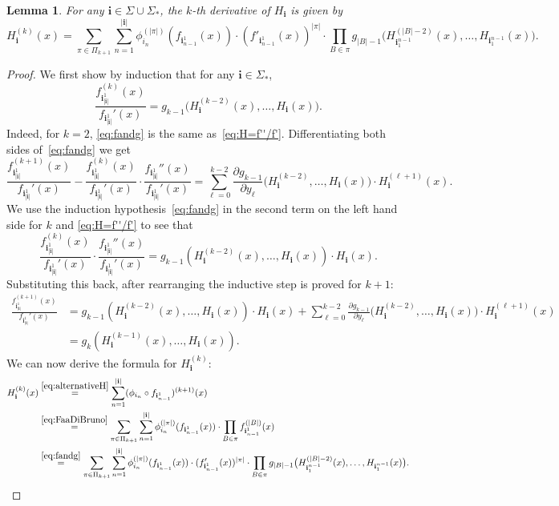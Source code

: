 \documentclass[11pt,a4paper]{article}
\def\cref#1{\ref{#1}}%
\newtheorem{lemma}[theorem]{Lemma}
\theoremstyle{definition}
\theoremstyle{remark}
\newcommand{\0}{\mathbf{0}}
\newcommand{\bi}{\mathbf{i}}
\numberwithin{equation}{section}
\begin{document}
\begin{lemma}
\label{thm:ugly}
For any $\bi\in\Sigma\cup\Sigma_*$, the $k$-th derivative of $H_{\bi}$ is given by
\[
H_{\bi}^{(k)}(x)
=\sum_{\pi\in\Pi_{k+1}} \sum_{n=1}^{|\bi|} \phi_{i_n}^{(|\pi|)}(f_{\bi_{n-1}^1}(x))\cdot
(f'_{\bi_{n-1}^1}(x))^{|\pi|}\cdot \prod_{B\in\pi}
g_{|B|-1}\big(H_{\bi_1^{n-1}}^{(|B|-2)}(x),\dots,H_{\bi_1^{n-1}}(x)\big).
\]
\end{lemma}
\begin{proof}
We first show by induction that for any $\bi\in\Sigma_*$,
\begin{equation}
	\label{eq:fandg}
	\frac{f_{\bi_{|\bi|}^1}^{(k)}(x)}{f_{\bi_{|\bi|}^1}'(x)}
	=
	g_{k-1}\big(H_{\bi}^{(k-2)}(x), \dots, H_{\bi}(x)\big).
\end{equation}
Indeed, for $k=2$, \cref{eq:fandg} is the same as~\cref{eq:H=f''/f'}. Differentiating both sides
of~\cref{eq:fandg} we get
\[
\frac{f_{\bi_{|\bi|}^1}^{(k+1)}(x)}{f_{\bi_{|\bi|}^1}'(x)} -
\frac{f_{\bi_{|\bi|}^1}^{(k)}(x)}{f_{\bi_{|\bi|}^1}'(x)}\cdot
\frac{f_{\bi_{|\bi|}^1}''(x)}{f_{\bi_{|\bi|}^1}'(x)}
=\sum_{\ell=0}^{k-2}\frac{\partial g_{k-1}}{\partial
y_{\ell}}\big(H_{\bi}^{(k-2)},\dots,H_{\bi}(x)\big) \cdot H_{\bi}^{(\ell+1)}(x).
\]
We use the induction hypothesis~\cref{eq:fandg} in the second term on the left hand side for $k$
and \cref{eq:H=f''/f'} to see that
\[
\frac{f_{\bi_{|\bi|}^1}^{(k)}(x)}{f_{\bi_{|\bi|}^1}'(x)}\cdot
\frac{f_{\bi_{|\bi|}^1}''(x)}{f_{\bi_{|\bi|}^1}'(x)}
=g_{k-1}(H_{\bi}^{(k-2)}(x),\dots, H_{\bi}(x)) \cdot H_{\bi}(x).
\]
Substituting this back, after rearranging the inductive step is proved for $k+1$: 
\begin{align*}
\frac{f_{\bi_{|\bi|}^1}^{(k+1)}(x)}{f_{\bi_{|\bi|}^1}'(x)}
&=
g_{k-1}(H_{\bi}^{(k-2)}(x),\dots, H_{\bi}(x)) \cdot H_{\bi}(x)
+
\sum_{\ell=0}^{k-2}\frac{\partial g_{k-1}}{\partial
y_{\ell}}\big(H_{\bi}^{(k-2)},\dots,H_{\bi}(x)\big) \cdot H_{\bi}^{(\ell+1)}(x)
\\
&=
g_{k}(H_{\bi}^{(k-1)}(x), \dots, H_{\bi}(x)).
\end{align*}
We can now derive the formula for $H_{\bi}^{(k)}$:
\begin{align*}
H_{\bi}^{(k)}(x)
&\stackrel{\eqref{eq:alternativeH}}{=}\sum_{n=1}^{|\bi|} (\phi_{i_n}\circ f_{\bi_{n-1}^1})^{(k+1)}(x) \\
&\stackrel{\eqref{eq:FaaDiBruno}}{=}\sum_{\pi\in\Pi_{k+1}} \sum_{n=1}^{|\bi|}
\phi_{i_n}^{(|\pi|)}(f_{\bi_{n-1}^1}(x))\cdot
\prod_{B\in\pi} f_{\bi_{n-1}^1}^{(|B|)}(x) \\
&\stackrel{\eqref{eq:fandg}}{=}\sum_{\pi\in\Pi_{k+1}} \sum_{n=1}^{|\bi|}
\phi_{i_n}^{(|\pi|)}(f_{\bi_{n-1}^1}(x))\cdot
(f'_{\bi_{n-1}^1}(x))^{|\pi|} \cdot \prod_{B\in\pi}
g_{|B|-1}\big(H_{\bi_1^{n-1}}^{(|B|-2)}(x),\dots,H_{\bi_1^{n-1}}(x)\big).
\end{align*}
\end{proof}
\end{document}
